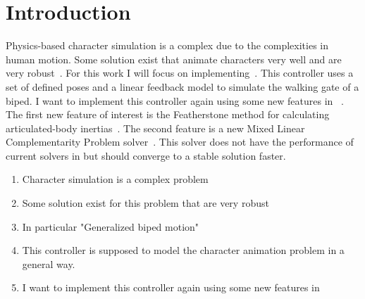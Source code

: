 
\section{Introduction}
\label{sec:Intro}


Physics-based character simulation is a complex due to the complexities in human motion.
Some solution exist that animate characters very well and are very robust~\cite{Yin07,Coros09}.
For this work I will focus on implementing~\cite{Yin07}.
This controller uses a set of defined poses and a linear feedback model to simulate the walking gate of a biped.
I want to implement this controller again using some new features in \bulletPhysics~\cite{coumans2013bullet}.
The first new feature of interest is the Featherstone method for calculating articulated-body inertias~\cite{featherstone2014rigid}. 
The second feature is a new Mixed Linear Complementarity Problem solver~. 
This solver does not have the performance of current solvers in \bulletPhysics but should converge to a stable solution faster.

\begin{enumerate}
	\item {Character simulation is a complex problem}
	\item {Some solution exist for this problem that are very robust}
	\item {In particular "Generalized biped motion"}
	\item {This controller is supposed to model the character animation problem in a general way.}
	\item {I want to implement this controller again using some new features in \bulletPhysics}
\end{enumerate}
